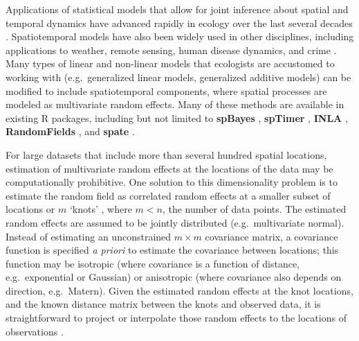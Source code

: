 \documentclass[12pt,english]{article}
\begin{document}
\begin{spacing}{1.05}
Applications of statistical models that allow for joint inference about spatial
and temporal dynamics have advanced rapidly in ecology over the last several
decades \citep{bascompte1995, latimer2009}. Spatiotemporal models have also
been widely used in other disciplines, including applications to weather,
remote sensing, human disease dynamics, and crime \citep{cressie2011}. Many
types of linear and non-linear models that ecologists are accustomed to working
with (e.g.~generalized linear models, generalized additive models) can be
modified to include spatiotemporal components, where spatial processes are
modeled as multivariate random effects. Many of these methods are available in
existing R packages, including but not limited to \textbf{spBayes}
\citep{finley2007}, \textbf{spTimer} \citep{bakar2015}, \textbf{INLA}
\citep{rue2009}, \textbf{RandomFields} \citep{schlather2016}, and
\textbf{spate} \citep{sigrist2015}.

For large datasets that include more than several hundred spatial locations,
estimation of multivariate random effects at the locations of the data may be
computationally prohibitive. One solution to this dimensionality problem is to
estimate the random field as correlated random effects at a smaller subset of
locations or $m$ `knots' \citep[e.g.][]{latimer2009, shelton2014}, where $m
  < n$, the number of data points. The estimated random effects are assumed to
be jointly distributed (e.g.~multivariate normal). Instead of estimating an
unconstrained $m \times m$ covariance matrix, a covariance function is
specified \emph{a priori} to estimate the covariance between locations; this
function may be isotropic (where covariance is a function of distance,
e.g.~exponential or Gaussian) or anisotropic (where covariance also depends on
direction, e.g.~Matern). Given the estimated random effects at the knot
locations, and the known distance matrix between the knots and observed data,
it is straightforward to project or interpolate those random effects to the
locations of observations \citep{latimer2009, finley2009}.


\end{spacing}
\end{document}
